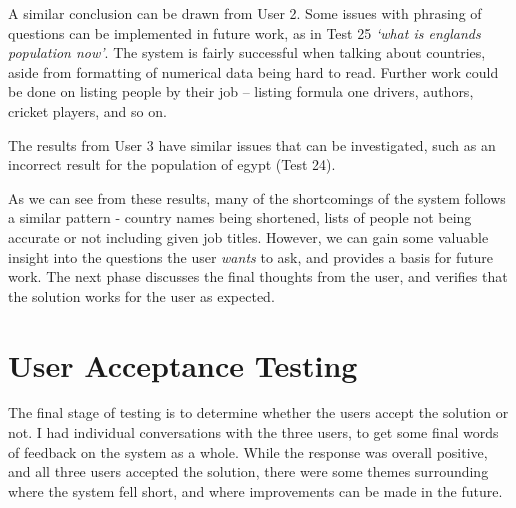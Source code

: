 A similar conclusion can be drawn from User 2. Some issues with phrasing of questions can be implemented in future work, as in Test 25 {\it `what is englands population now'}. The system is fairly successful when talking about countries, aside from formatting of numerical data being hard to read. Further work could be done on listing people by their job -- listing formula one drivers, authors, cricket players, and so on.

The results from User 3 have similar issues that can be investigated, such as an incorrect result for the population of egypt (Test 24).

As we can see from these results, many of the shortcomings of the system follows a similar pattern - country names being shortened, lists of people not being accurate or not including given job titles. However, we can gain some valuable insight into the questions the user {\it wants} to ask, and provides a basis for future work. The next phase discusses the final thoughts from the user, and verifies that the solution works for the user as expected.

\section{User Acceptance Testing}
The final stage of testing is to determine whether the users accept the solution or not. I had individual conversations with the three users, to get some final words of feedback on the system as a whole. While the response was overall positive, and all three users accepted the solution, there were some themes surrounding where the system fell short, and where improvements can be made in the future.

